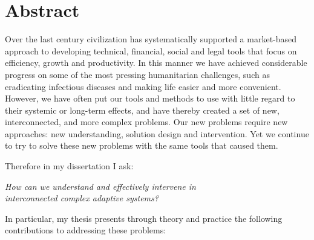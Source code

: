 


\begingroup
\let\clearpage\relax
\let\cleardoublepage\relax
\let\cleardoublepage\relax

\chapter*{Abstract}

Over the last century civilization has systematically supported a market-based approach to developing technical, financial, social and legal tools that focus on efficiency, growth and productivity. In this manner we have achieved considerable progress on some of the most pressing humanitarian challenges, such as eradicating infectious diseases and making life easier and more convenient. However, we have often put our tools and methods to use with little regard to their systemic or long-term effects, and have thereby created a set of new, interconnected, and more complex problems. Our new problems require new approaches: new understanding, solution design and intervention. Yet we continue to try to solve these new problems with the same tools that caused them.

\medskip

Therefore in my dissertation I ask:

\begin{center}
\textit{How can we understand and effectively intervene in\\
interconnected complex adaptive systems?}

\end{center}

In particular, my thesis presents through theory and practice the following contributions to addressing these problems:


